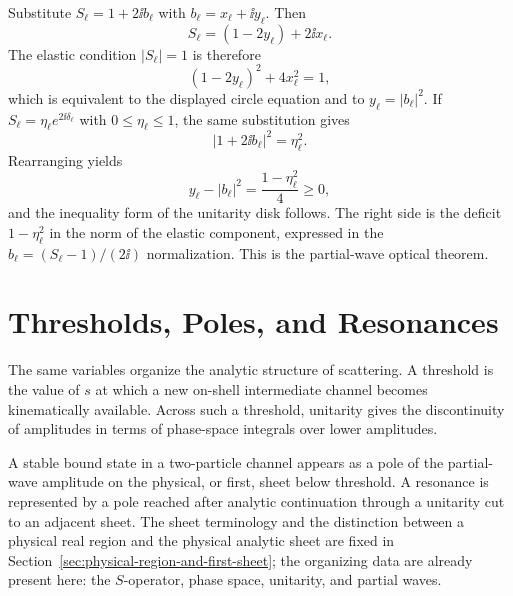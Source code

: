 Substitute \(S_\ell=1+2\ii b_\ell\) with
\(b_\ell=x_\ell+\ii y_\ell\).  Then
\[
  S_\ell=(1-2y_\ell)+2\ii x_\ell .
\]
The elastic condition \(|S_\ell|=1\) is therefore
\[
  (1-2y_\ell)^2+4x_\ell^2=1,
\]
which is equivalent to the displayed circle equation and to
\(y_\ell=|b_\ell|^2\).  If \(S_\ell=\eta_\ell e^{2\ii\delta_\ell}\) with
\(0\le\eta_\ell\le1\), the same substitution gives
\[
  \left|1+2\ii b_\ell\right|^2=\eta_\ell^2 .
\]
Rearranging yields
\[
  y_\ell-|b_\ell|^2=\frac{1-\eta_\ell^2}{4}\ge0,
\]
and the inequality form of the unitarity disk follows.  The right side is the
deficit \(1-\eta_\ell^2\) in the norm of the elastic component, expressed in
the \(b_\ell=(S_\ell-1)/(2\ii)\) normalization.  This is the partial-wave
optical theorem.

\section{Thresholds, Poles, and Resonances}

The same variables organize the analytic structure of scattering.  A
threshold is the value of \(s\) at which a new on-shell intermediate channel
becomes kinematically available.  Across such a threshold, unitarity gives
the discontinuity of amplitudes in terms of phase-space integrals over lower
amplitudes.

A stable bound state in a two-particle channel appears as a pole of the
partial-wave amplitude on the physical, or first, sheet below threshold.  A
resonance is represented by a pole reached after analytic continuation through
a unitarity cut to an adjacent sheet.  The sheet terminology and the distinction
between a physical real region and the physical analytic sheet are fixed in
Section~\ref{sec:physical-region-and-first-sheet}; the organizing data are
already present here: the \(S\)-operator, phase space, unitarity, and partial
waves.

